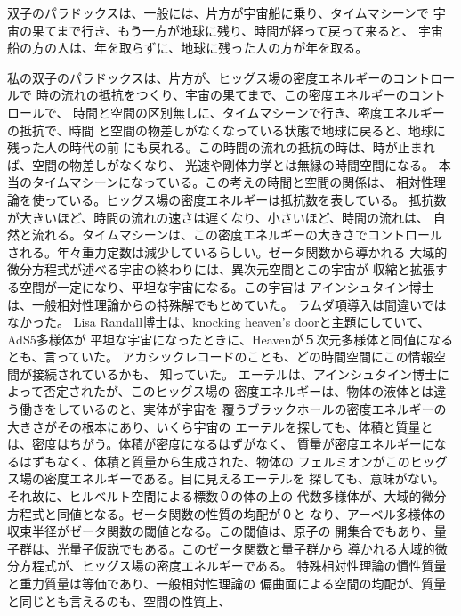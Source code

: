 \documentclass{jsarticle}
\begin{document}
\title{}
\author{}
\date{}
\maketitle

  双子のパラドックスは、一般には、片方が宇宙船に乗り、タイムマシーンで
宇宙の果てまで行き、もう一方が地球に残り、時間が経って戻って来ると、
宇宙船の方の人は、年を取らずに、地球に残った人の方が年を取る。

  私の双子のパラドックスは、片方が、ヒッグス場の密度エネルギーのコントロールで
時の流れの抵抗をつくり、宇宙の果てまで、この密度エネルギーのコントロールで、
時間と空間の区別無しに、タイムマシーンで行き、密度エネルギーの抵抗で、時間
と空間の物差しがなくなっている状態で地球に戻ると、地球に残った人の時代の前
にも戻れる。この時間の流れの抵抗の時は、時が止まれば、空間の物差しがなくなり、
光速や剛体力学とは無縁の時間空間になる。
本当のタイムマシーンになっている。この考えの時間と空間の関係は、
相対性理論を使っている。ヒッグス場の密度エネルギーは抵抗数を表している。
抵抗数が大きいほど、時間の流れの速さは遅くなり、小さいほど、時間の流れは、
自然と流れる。タイムマシーンは、この密度エネルギーの大きさでコントロール
される。年々重力定数は減少しているらしい。ゼータ関数から導かれる
大域的微分方程式が述べる宇宙の終わりには、異次元空間とこの宇宙が
収縮と拡張する空間が一定になり、平坦な宇宙になる。この宇宙は
アインシュタイン博士は、一般相対性理論からの特殊解でもとめていた。
ラムダ項導入は間違いではなかった。
Lisa Randall博士は、knocking heaven's doorと主題にしていて、AdS5多様体が
平坦な宇宙になったときに、Heavenが５次元多様体と同値になるとも、言っていた。
アカシックレコードのことも、どの時間空間にこの情報空間が接続されているかも、
知っていた。
エーテルは、アインシュタイン博士によって否定されたが、このヒッグス場の
密度エネルギーは、物体の液体とは違う働きをしているのと、実体が宇宙を
覆うブラックホールの密度エネルギーの大きさがその根本にあり、いくら宇宙の
エーテルを探しても、体積と質量とは、密度はちがう。体積が密度になるはずがなく、
質量が密度エネルギーになるはずもなく、体積と質量から生成された、物体の
フェルミオンがこのヒッグス場の密度エネルギーである。目に見えるエーテルを
探しても、意味がない。それ故に、ヒルベルト空間による標数０の体の上の
代数多様体が、大域的微分方程式と同値となる。ゼータ関数の性質の均配が０と
なり、アーベル多様体の収束半径がゼータ関数の閾値となる。この閾値は、原子の
開集合でもあり、量子群は、光量子仮説でもある。このゼータ関数と量子群から
導かれる大域的微分方程式が、ヒッグス場の密度エネルギーである。
特殊相対性理論の慣性質量と重力質量は等価であり、一般相対性理論の
偏曲面による空間の均配が、質量と同じとも言えるのも、空間の性質上、
\end{document}
